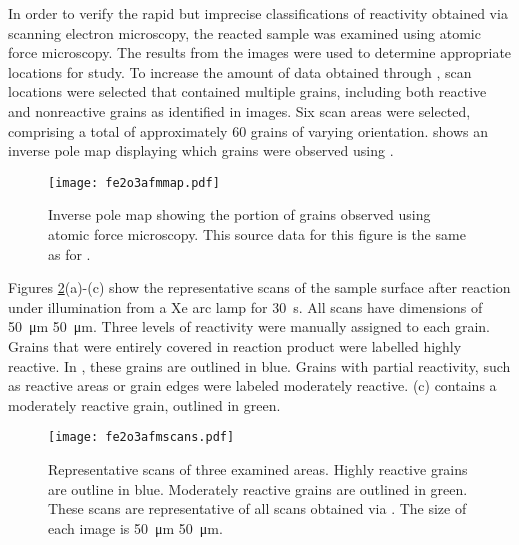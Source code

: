 In order to verify the rapid but imprecise classifications of reactivity obtained via scanning electron microscopy, the reacted sample was examined using atomic force microscopy. The results from the  images were used to determine appropriate locations for study. To increase the amount of data obtained through , scan locations were selected that contained multiple grains, including both reactive and nonreactive grains as identified in  images. Six scan areas were selected, comprising a total of approximately 60 grains of varying orientation.  shows an inverse pole map displaying which grains were observed using .
\begin{figure}
	\texttt{[image: fe2o3afmmap.pdf]}
	\caption[Inverse pole map of grains observed using .]{%
		Inverse pole map showing the portion of grains observed using atomic force microscopy. This source data for this 
		figure is the same as for .}
	\label{fig:fe2o3afmmap}
\end{figure}

Figures \ref{fig:fe2o3afmscans}(a)-(c) show the representative  scans of the sample surface after reaction under illumination from a Xe arc lamp for \SI{30}{\second}. All scans have dimensions of \SI{50}{\micro\meter} \texttimes{} \SI{50}{\micro\meter}. Three levels of reactivity were manually assigned to each grain. Grains that were entirely covered in reaction product were labelled highly reactive. In , these grains are outlined in blue. Grains with partial reactivity, such as reactive areas or grain edges were labeled moderately reactive. (c) contains a moderately reactive grain, outlined in green.
\begin{figure}[b]
	\texttt{[image: fe2o3afmscans.pdf]}
	\caption[Representative  scans of three examined areas]{%
		Representative  scans of three examined areas. Highly reactive grains are outline in blue. 
		Moderately reactive grains are outlined in green. These scans are representative of all scans 
		obtained via . The size of each image is \SI{50}{\micro\meter} \texttimes{} \SI{50}{\micro\meter}.}
	\label{fig:fe2o3afmscans}
\end{figure} 

